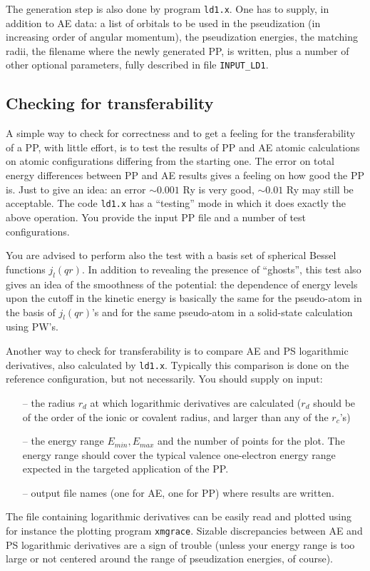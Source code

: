 The generation step is also done by program {\tt ld1.x}.
One has to supply, in addition to AE data: a list of 
orbitals to be used in the pseudization (in increasing
order of angular momentum), the pseudization energies, 
the matching radii, the filename where the newly generated
PP, is written, plus a number of other optional parameters, 
fully described in file {\tt INPUT\_LD1}.

\subsection{Checking for transferability}

A simple way to check for correctness and to get a feeling for 
the transferability of a PP, with little effort, is to test the 
results of PP and AE atomic calculations on atomic configurations 
differing from the starting one. The error on total energy 
differences between PP and AE results gives a feeling on how 
good the PP is. Just to give an idea: an error $\sim 0.001$ Ry 
is very good, $\sim 0.01$ Ry may still be acceptable.
The code {\tt ld1.x} has a ``testing'' mode in which it does
exactly the above operation. You provide the input PP file and
a number of test configurations.

You are advised to perform also the test with a basis set of spherical
Bessel functions $j_l (qr)$. In addition to revealing the presence of
``ghosts'', this test also gives an idea of the smoothness of the 
potential: the dependence of energy levels upon the cutoff in the kinetic 
energy is basically the same for the pseudo-atom in the basis of $j_l (qr)$'s
and for the same pseudo-atom in a solid-state calculation using PW's.

Another way to check for transferability is to compare AE and PS 
logarithmic derivatives, also calculated by {\tt ld1.x}. Typically 
this comparison is done on the reference configuration,
but not necessarily. You should supply on input:
\begin{enumerate}
\item[--] the radius $r_d$ at which logarithmic derivatives are 
          calculated ($r_d$ should be of the order of the
          ionic or covalent radius, and larger than any of the $r_c$'s)
\item[--] the energy range $E_{min}, E_{max}$ and the number 
          of points for the plot. The energy range
          should cover the typical valence one-electron energy 
          range expected in the targeted application of the PP. 
\item[--] output file names (one for AE, one for PP) where results 
          are written.
\end{enumerate}
The file containing logarithmic derivatives can be easily read and 
plotted using for instance the plotting program {\tt xmgrace}. 
Sizable discrepancies between AE and PS logarithmic derivatives 
are a sign of trouble (unless your energy range is too large or 
not centered around the range of pseudization energies, of course).

